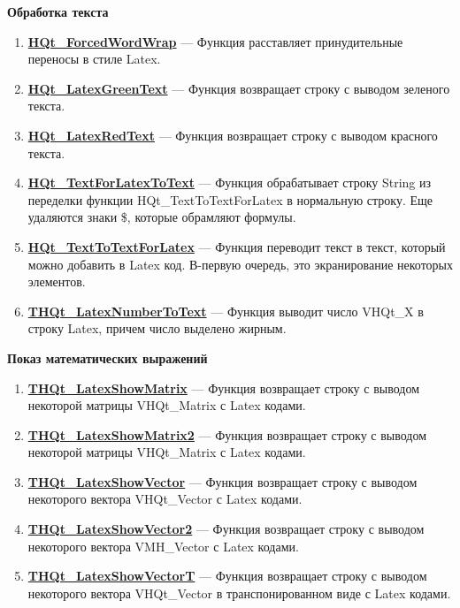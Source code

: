 \documentclass[a4paper,12pt]{article}
\begin{document}
\textbf{Обработка текста}
\begin{enumerate}

\item \textbf{\hyperref[HQt_ForcedWordWrap]{HQt\_ForcedWordWrap}} --- Функция расставляет принудительные переносы в стиле Latex.

\item \textbf{\hyperref[HQt_LatexGreenText]{HQt\_LatexGreenText}} --- Функция возвращает строку с выводом зеленого текста.

\item \textbf{\hyperref[HQt_LatexRedText]{HQt\_LatexRedText}} --- Функция возвращает строку с выводом красного текста.

\item \textbf{\hyperref[HQt_TextForLatexToText]{HQt\_TextForLatexToText}} --- Функция обрабатывает строку String из переделки функции HQt\_TextToTextForLatex в нормальную строку. Еще удаляются знаки \$, которые обрамляют формулы.

\item \textbf{\hyperref[HQt_TextToTextForLatex]{HQt\_TextToTextForLatex}} --- Функция переводит текст в текст, который можно добавить в Latex код. В-первую очередь, это экранирование некоторых элементов.

\item \textbf{\hyperref[THQt_LatexNumberToText]{THQt\_LatexNumberToText}} --- Функция выводит число VHQt\_X в строку Latex, причем число выделено жирным.

\end{enumerate}

\textbf{Показ математических выражений}
\begin{enumerate}

\item \textbf{\hyperref[THQt_LatexShowMatrix]{THQt\_LatexShowMatrix}} --- Функция возвращает строку с выводом некоторой матрицы VHQt\_Matrix с Latex кодами.

\item \textbf{\hyperref[THQt_LatexShowMatrix2]{THQt\_LatexShowMatrix2}} --- Функция возвращает строку с выводом некоторой матрицы VHQt\_Matrix с Latex кодами.

\item \textbf{\hyperref[THQt_LatexShowVector]{THQt\_LatexShowVector}} --- Функция возвращает строку с выводом некоторого вектора VHQt\_Vector с Latex кодами.

\item \textbf{\hyperref[THQt_LatexShowVector2]{THQt\_LatexShowVector2}} --- Функция возвращает строку с выводом некоторого вектора VMH\_Vector с Latex кодами.

\item \textbf{\hyperref[THQt_LatexShowVectorT]{THQt\_LatexShowVectorT}} --- Функция возвращает строку с выводом некоторого вектора VHQt\_Vector в транспонированном виде с Latex кодами.

\end{enumerate}
\end{document}
